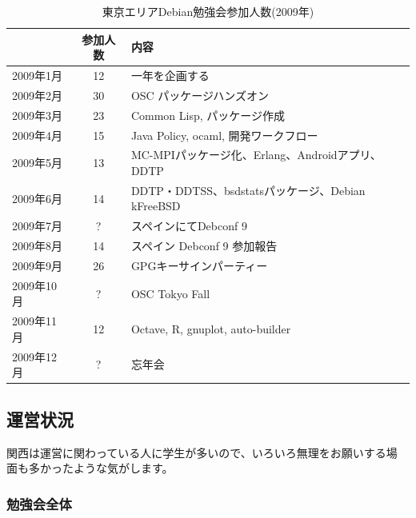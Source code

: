 \documentclass[mingoth,a4paper]{jsarticle}
\begin{document}
\begin{table}[t]
\begin{minipage}{0.5\hsize}
 \caption{東京エリアDebian勉強会参加人数(2009年)}\label{tab:count2009}
 \begin{center}
  \begin{tabular}{|l|c|p{10em}|}
 \hline
 & 参加人数 & 内容\\
 \hline
   2009年1月 & 12 & 一年を企画する \\
   2009年2月 & 30 & OSC パッケージハンズオン\\ 
   2009年3月 & 23 & Common Lisp, パッケージ作成 \\
   2009年4月 & 15 & Java Policy, ocaml, 開発ワークフロー\\
   2009年5月 & 13 & MC-MPIパッケージ化、Erlang、Androidアプリ、DDTP \\   
   2009年6月 & 14 & DDTP・DDTSS、bsdstatsパッケージ、Debian kFreeBSD\\
   2009年7月 & ? & スペインにてDebconf 9\\
   2009年8月 & 14 & スペイン Debconf 9 参加報告 \\   
   2009年9月 & 26 & GPGキーサインパーティー \\   
   2009年10月 & ? & OSC Tokyo Fall\\
   2009年11月 & 12 & Octave, R, gnuplot, auto-builder \\
   2009年12月 & ? & 忘年会\\
 \hline
  \end{tabular}
 \end{center}
\end{minipage}
\end{table}



\subsection{運営状況}

関西は運営に関わっている人に学生が多いので、いろいろ無理をお願いする場
面も多かったような気がします。

\subsubsection{勉強会全体}
\end{document}
